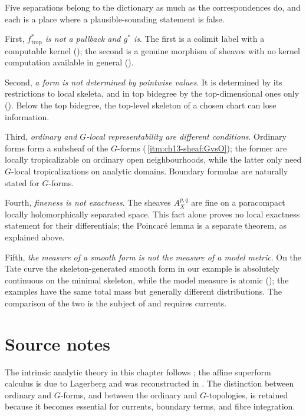 Five separations belong to the dictionary as much as the correspondences do,
and each is a place where a plausible-sounding statement is false.

First, \emph{$f_{\mathrm{trop}}^*$ is not a pullback and $g^*$ is}.  The
first is a colimit label with a computable kernel
(); the second is a genuine morphism of sheaves with
no kernel computation available in general
().

Second, \emph{a form is not determined by pointwise values}.  It is
determined by its restrictions to local skeleta, and in top bidegree by the
top-dimensional ones only ().  Below the
top bidegree, the top-level skeleton of a chosen chart can lose information.

Third, \emph{ordinary and $G$-local representability are different
conditions}.  Ordinary forms form a subsheaf of the $G$-forms
(\,\cref{itm:ch13-sheaf:GvsO}); the former are locally
tropicalizable on ordinary open neighbourhoods, while the latter only need
$G$-local tropicalizations on analytic domains.  Boundary formulae are
naturally stated for $G$-forms.

Fourth, \emph{fineness is not exactness}.  The sheaves $A^{p,q}_X$ are fine
on a paracompact locally holomorphically separated space.  This fact
alone proves no local exactness statement for their differentials;
the Poincar\'e lemma is a separate theorem, as explained above.

Fifth, \emph{the measure of a smooth form is not the measure of a model
metric}.  On the Tate curve the skeleton-generated smooth form in our
example is absolutely continuous on the minimal skeleton, while the model
measure is atomic
(); the examples have the same total mass but
generally different distributions.
The comparison of the two is the subject of
 and requires currents.

\section*{Source notes}

The intrinsic analytic theory in this chapter follows
\cite[Chapters~15--16]{CLD25}; the affine superform calculus is due to
Lagerberg and was reconstructed in .  The
distinction between ordinary and $G$-forms, and between the ordinary and
$G$-topologies, is retained because it becomes essential for currents,
boundary terms, and fibre integration.

